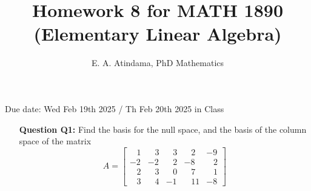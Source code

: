 \documentclass[a4paper,11pt,reqno]{amsart}
\title[MATH 1890 (Elementary Linear Algebra)]{Homework 8 for MATH 1890 (Elementary Linear Algebra)}
\author[Emmanuel Atindama]{E. A. Atindama, PhD Mathematics}
\numberwithin{equation}{section}
\begin{document}
\maketitle
Due date: Wed Feb 19th 2025 / Th Feb 20th 2025 in Class
\vspace{0.5cm}

\begin{enumerate}
    \item[\textbf{Question Q1:}]  Find the basis for the null space, and the basis of the column space of the matrix
\[
    A = \begin{bmatrix}
        \;\;\;1 & \;\;\;3 & \;\;\;3 & \;\;\;2 & -9\\
        -2 & -2 & \;\;\;2 & -8 & \;\;\;2\\
        \;\;\;2 & \;\;\;3 & \;\;\;0 & \;\;\;7 & \;\;\;1\\
         \;\;\;3 & \;\;\;4 & -1 & \;\;\;11 & -8
    \end{bmatrix}
    \]
\end{enumerate}
\end{document}
